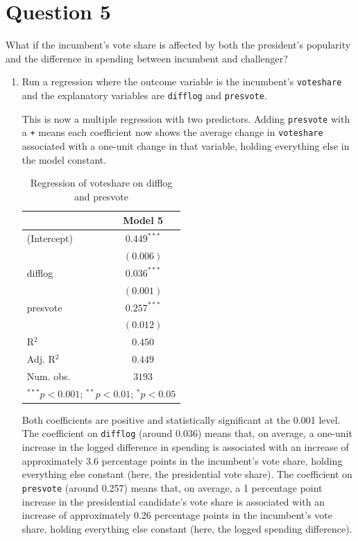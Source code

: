 \documentclass[12pt,letterpaper]{article}
\begin{document}
\section*{Question 5}
\noindent What if the incumbent's vote share is affected by both the president's popularity and the difference in spending between incumbent and challenger? 
	\begin{enumerate}
		\item Run a regression where the outcome variable is the incumbent's \texttt{voteshare} and the explanatory variables are \texttt{difflog} and \texttt{presvote}.	
		
		\noindent This is now a multiple regression with two predictors. Adding \texttt{presvote} with a \texttt{+} means each coefficient now shows the average change in \texttt{voteshare} associated with a one-unit change in that variable, holding everything else in the model constant.
		
		
		
	\begin{table} [H]
		\begin{center}
			\begin{tabular}{l c}
				\hline
				& Model 5 \\
				\hline
				(Intercept) & $0.449^{***}$ \\
				& $(0.006)$     \\
				difflog     & $0.036^{***}$ \\
				& $(0.001)$     \\
				presvote    & $0.257^{***}$ \\
				& $(0.012)$     \\
				\hline
				R$^2$       & $0.450$       \\
				Adj. R$^2$  & $0.449$       \\
				Num. obs.   & $3193$        \\
				\hline
				\multicolumn{2}{l}{\scriptsize{$^{***}p<0.001$; $^{**}p<0.01$; $^{*}p<0.05$}}
			\end{tabular}
			\caption{Regression of voteshare on difflog and presvote}
			\label{table:model5}
		\end{center}
	\end{table}
		
		\noindent Both coefficients are positive and statistically significant at the 0.001 level. The coefficient on \texttt{difflog} (around 0.036) means that, on average, a one-unit increase in the logged difference in spending is associated with an increase of approximately 3.6 percentage points in the incumbent's vote share, holding everything else constant (here, the presidential vote share). The coefficient on \texttt{presvote} (around 0.257) means that, on average, a 1 percentage point increase in the presidential candidate's vote share is associated with an increase of approximately 0.26 percentage points in the incumbent's vote share, holding everything else constant (here, the logged spending difference).
		

\end{enumerate}
\end{document}
